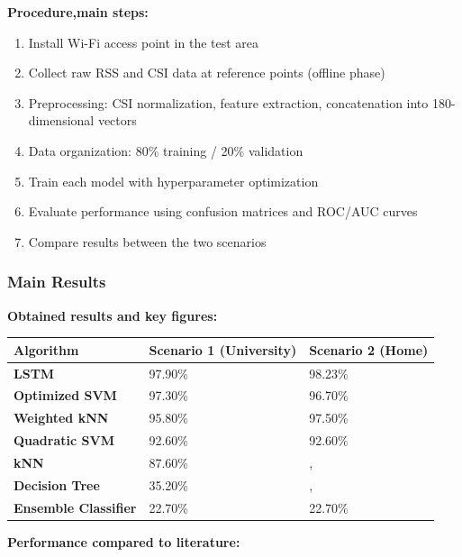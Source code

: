 \documentclass{ipgpmaster}
\begin{document}
\textbf{Procedure,main steps:}

\begin{enumerate}
    \item Install Wi-Fi access point in the test area 
    \item Collect raw RSS and CSI data at reference points (offline phase) 
    \item Preprocessing: CSI normalization, feature extraction, concatenation into 180-dimensional vectors 
    \item Data organization: 80\% training / 20\% validation 
    \item Train each model with hyperparameter optimization 
    \item Evaluate performance using confusion matrices and ROC/AUC curves 
    \item Compare results between the two scenarios 
\end{enumerate}

\subsubsection{\textbf{Main Results}}

\textbf{Obtained results and key figures:}

\begin{table}
\centering

\begin{tabular}{| l | l | l |}
\hline
Algorithm & Scenario 1 (University) & Scenario 2 (Home) \\
\hline
\textbf{LSTM} & 97.90\% & 98.23\% \\
\hline
\textbf{Optimized SVM} & 97.30\% & 96.70\% \\
\hline
\textbf{Weighted kNN} & 95.80\% & 97.50\% \\
\hline
\textbf{Quadratic SVM} & 92.60\% & 92.60\% \\
\hline
\textbf{kNN} & 87.60\% &,\\
\hline
\textbf{Decision Tree} & 35.20\% &,\\
\hline
\textbf{Ensemble Classifier} & 22.70\% & 22.70\% \\
\hline

\end{tabular}

\end{table}

\textbf{Performance compared to literature:}
\end{document}
